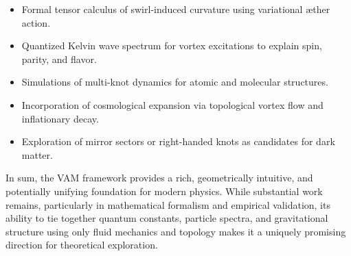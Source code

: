 \begin{itemize}
    \item Formal tensor calculus of swirl-induced curvature using variational æther action.
    \item Quantized Kelvin wave spectrum for vortex excitations to explain spin, parity, and flavor.
    \item Simulations of multi-knot dynamics for atomic and molecular structures.
    \item Incorporation of cosmological expansion via topological vortex flow and inflationary decay.
    \item Exploration of mirror sectors or right-handed knots as candidates for dark matter.
\end{itemize}

In sum, the VAM framework provides a rich, geometrically intuitive, and potentially unifying foundation for modern physics. While substantial work remains, particularly in mathematical formalism and empirical validation, its ability to tie together quantum constants, particle spectra, and gravitational structure using only fluid mechanics and topology makes it a uniquely promising direction for theoretical exploration.
